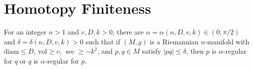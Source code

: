 \section{Homotopy Finiteness}

\begin{lemma}
  \label{lem:pet-ch12-alpha-regular-existence}
  For an integer $n>1$ and $v,D,k>0$, there are
  $\alpha=\alpha(n,D,v,k)\in(0,\pi/2)$ and $\delta=\delta(n,D,v,k)>0$ such that
  if $(M,g)$ is a Riemannian $n$-manifold with $\mathrm{diam}\le D$,
  $\mathrm{vol}\ge v$, $\sec\ge-k^2$, and $p,q\in M$ satisfy $|pq|\le\delta$,
  then $p$ is $\alpha$-regular for $q$ or $q$ is $\alpha$-regular for $p$.
\end{lemma}
